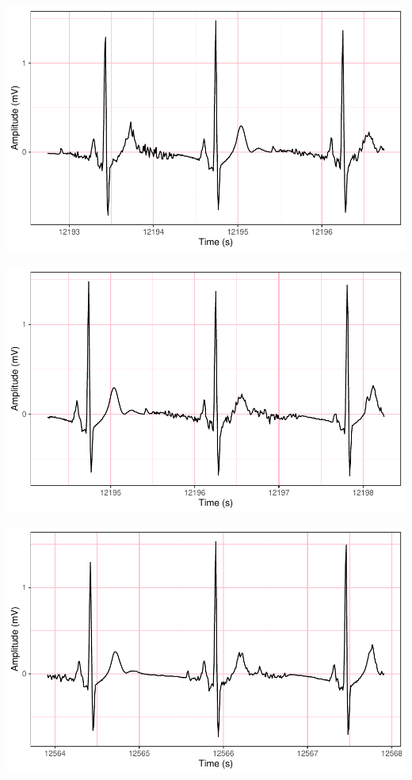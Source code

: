 \documentclass[
]{article}
\begin{document}
\begin{center}\includegraphics{report_files/figure-latex/abnormal-interval-9} \end{center}

\begin{center}\includegraphics{report_files/figure-latex/abnormal-interval-10} \end{center}

\begin{center}\includegraphics{report_files/figure-latex/abnormal-interval-11} \end{center}
\end{document}
